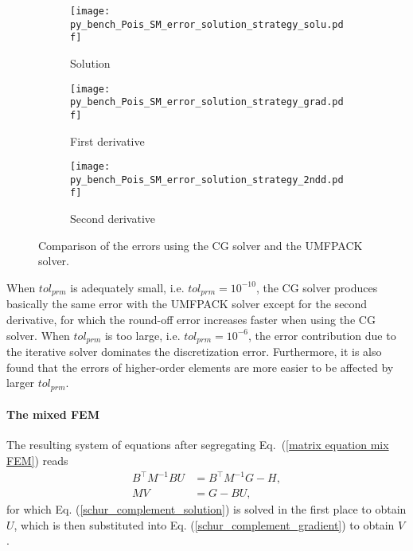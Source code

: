 \documentclass[review,3p]{elsarticle}
\begin{document}
\begin{figure}[!ht]
    \begin{subfigure}{5.5cm}
        \texttt{[image: py\_bench\_Pois\_SM\_error\_solution\_strategy\_solu.pdf]}
        \caption{Solution}
        \label{py_bench_Pois_SM_error_solution_strategy_solu}
    \end{subfigure}
    \hspace{-0.2cm}
    \begin{subfigure}{5.5cm}
        \texttt{[image: py\_bench\_Pois\_SM\_error\_solution\_strategy\_grad.pdf]}
        \caption{First derivative}
        \label{py_bench_Pois_SM_error_solution_strategy_grad}
    \end{subfigure}
    \hspace{-0.2cm}
    \begin{subfigure}{5.5cm}
        \texttt{[image: py\_bench\_Pois\_SM\_error\_solution\_strategy\_2ndd.pdf]}
        \caption{Second derivative}
        \label{py_bench_Pois_SM_error_solution_strategy_2ndd}
    \end{subfigure}
\caption{Comparison of the errors using the CG solver and the UMFPACK solver.}
\label{py_bench_Pois_SM_error_solution_strategy}
\end{figure}

When $tol_{prm}$ is adequately small, i.e. $tol_{prm}=10^{-10}$, the CG solver produces basically the same error with the UMFPACK solver except for the second derivative, for which the round-off error increases faster when using the CG solver.
When $tol_{prm}$ is too large, i.e. $tol_{prm}=10^{-6}$, the error contribution due to the iterative solver dominates the discretization error. Furthermore, it is also found that the errors of higher-order elements are more easier to be affected by larger $tol_{prm}$.

\paragraph{The mixed FEM}

The resulting system of equations after segregating Eq.~(\ref{matrix equation mix FEM}) reads
\begin{subequations}
 \begin{align}
  B^{\top} M^{-1} B U &= B^{\top} M^{-1} G - H, 	\label{schur_complement_solution} \\
  MV&=G-BU,						\label{schur_complement_gradient}
\end{align}						\label{schur_complement_solu_grad}%
\end{subequations}
for which Eq. (\ref{schur_complement_solution}) is solved in the first place to obtain $U$, which is then substituted into Eq. (\ref{schur_complement_gradient}) to obtain $V$.
\end{document}
